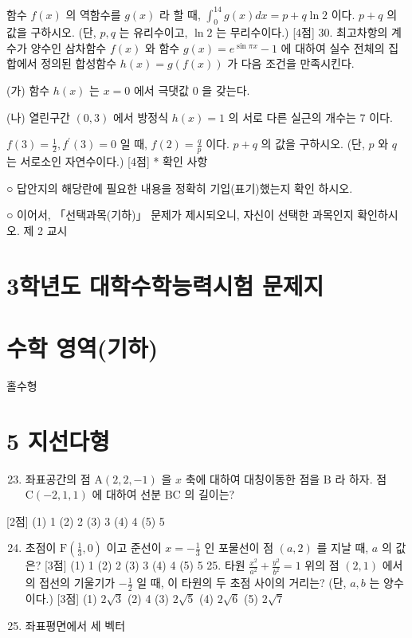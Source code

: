 \documentclass[10pt]{article}
\begin{document}
함수 $f(x)$ 의 역함수를 $g(x)$ 라 할 때, $\int_{0}^{14} g(x) d x=p+q \ln 2$ 이다. $p+q$ 의 값을 구하시오. (단, $p, q$ 는 유리수이고, $\ln 2$ 는 무리수이다.) [4점] 30. 최고차항의 계수가 양수인 삼차함수 $f(x)$ 와 함수 $g(x)=e^{\sin \pi x}-1$ 에 대하여 실수 전체의 집합에서 정의된 합성함수 $h(x)=g(f(x))$ 가 다음 조건을 만족시킨다.

(가) 함수 $h(x)$ 는 $x=0$ 에서 극댓값 0 을 갖는다.

(나) 열린구간 $(0,3)$ 에서 방정식 $h(x)=1$ 의 서로 다른 실근의 개수는 7 이다.

$f(3)=\frac{1}{2}, f^{\prime}(3)=0$ 일 때, $f(2)=\frac{q}{p}$ 이다. $p+q$ 의 값을 구하시오. (단, $p$ 와 $q$ 는 서로소인 자연수이다.) [4점] * 확인 사항

○ 답안지의 해당란에 필요한 내용을 정확히 기입(표기)했는지 확인 하시오.

○ 이어서, 「선택과목(기하)」 문제가 제시되오니, 자신이 선택한 과목인지 확인하시오. 제 2 교시

\section{3학년도 대학수학능력시험 문제지}
\section{수학 영역(기하)}
홀수형

\section{5 지선다형}
\begin{enumerate}
  \setcounter{enumi}{22}
  \item 좌표공간의 점 $\mathrm{A}(2,2,-1)$ 을 $x$ 축에 대하여 대칭이동한 점을 $\mathrm{B}$ 라 하자. 점 $\mathrm{C}(-2,1,1)$ 에 대하여 선분 $\mathrm{BC}$ 의 길이는?
\end{enumerate}

[2점]
(1) 1
(2) 2
(3) 3
(4) 4
(5) 5

\begin{enumerate}
  \setcounter{enumi}{23}
  \item 초점이 $\mathrm{F}\left(\frac{1}{3}, 0\right)$ 이고 준선이 $x=-\frac{1}{3}$ 인 포물선이 점 $(a, 2)$ 를 지날 때, $a$ 의 값은? [3점]
(1) 1
(2) 2
(3) 3
(4) 4
(5) 5 25. 타원 $\frac{x^{2}}{a^{2}}+\frac{y^{2}}{b^{2}}=1$ 위의 점 $(2,1)$ 에서의 접선의 기울기가 $-\frac{1}{2}$ 일 때, 이 타원의 두 초점 사이의 거리는? (단, $a, b$ 는 양수이다.) [3점]
(1) $2 \sqrt{3}$
(2) 4
(3) $2 \sqrt{5}$
(4) $2 \sqrt{6}$
(5) $2 \sqrt{7}$

  \item 좌표평면에서 세 벡터

\end{enumerate}
\end{document}
